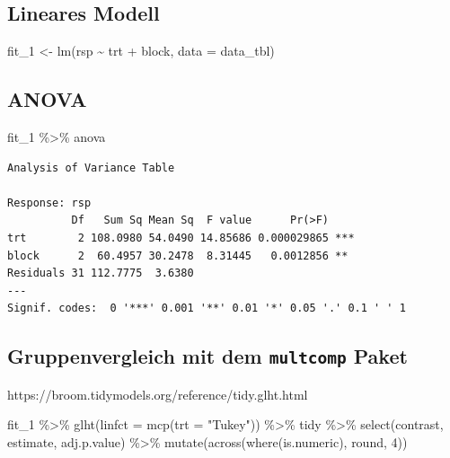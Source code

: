 \documentclass[
  letterpaper,
  DIV=11,
  oneside]{scrreport}
\newenvironment{Shaded}{\begin{snugshade}}{\end{snugshade}}
\newcommand{\AttributeTok}[1]{\textcolor[rgb]{0.40,0.45,0.13}{#1}}
\newcommand{\DecValTok}[1]{\textcolor[rgb]{0.68,0.00,0.00}{#1}}
\newcommand{\FunctionTok}[1]{\textcolor[rgb]{0.28,0.35,0.67}{#1}}
\newcommand{\NormalTok}[1]{\textcolor[rgb]{0.00,0.23,0.31}{#1}}
\newcommand{\OtherTok}[1]{\textcolor[rgb]{0.00,0.23,0.31}{#1}}
\newcommand{\SpecialCharTok}[1]{\textcolor[rgb]{0.37,0.37,0.37}{#1}}
\newcommand{\StringTok}[1]{\textcolor[rgb]{0.13,0.47,0.30}{#1}}
\begin{document}
\hypertarget{lineares-modell}{%
\subsection{Lineares Modell}\label{lineares-modell}}

\begin{Shaded}
\begin{Highlighting}[]
\NormalTok{fit\_1 }\OtherTok{\textless{}{-}} \FunctionTok{lm}\NormalTok{(rsp }\SpecialCharTok{\textasciitilde{}}\NormalTok{ trt }\SpecialCharTok{+}\NormalTok{ block, }\AttributeTok{data =}\NormalTok{ data\_tbl)}
\end{Highlighting}
\end{Shaded}

\hypertarget{anova}{%
\subsection{ANOVA}\label{anova}}

\begin{Shaded}
\begin{Highlighting}[]
\NormalTok{fit\_1 }\SpecialCharTok{\%\textgreater{}\%}\NormalTok{ anova}
\end{Highlighting}
\end{Shaded}

\begin{verbatim}
Analysis of Variance Table

Response: rsp
          Df   Sum Sq Mean Sq  F value      Pr(>F)    
trt        2 108.0980 54.0490 14.85686 0.000029865 ***
block      2  60.4957 30.2478  8.31445   0.0012856 ** 
Residuals 31 112.7775  3.6380                         
---
Signif. codes:  0 '***' 0.001 '**' 0.01 '*' 0.05 '.' 0.1 ' ' 1
\end{verbatim}

\hypertarget{gruppenvergleich-mit-dem-multcomp-paket}{%
\subsection{\texorpdfstring{Gruppenvergleich mit dem \texttt{multcomp}
Paket}{Gruppenvergleich mit dem multcomp Paket}}\label{gruppenvergleich-mit-dem-multcomp-paket}}

https://broom.tidymodels.org/reference/tidy.glht.html

\begin{Shaded}
\begin{Highlighting}[]
\NormalTok{fit\_1 }\SpecialCharTok{\%\textgreater{}\%} 
  \FunctionTok{glht}\NormalTok{(}\AttributeTok{linfct =} \FunctionTok{mcp}\NormalTok{(}\AttributeTok{trt =} \StringTok{"Tukey"}\NormalTok{)) }\SpecialCharTok{\%\textgreater{}\%} 
\NormalTok{  tidy }\SpecialCharTok{\%\textgreater{}\%} 
  \FunctionTok{select}\NormalTok{(contrast, estimate, adj.p.value) }\SpecialCharTok{\%\textgreater{}\%} 
  \FunctionTok{mutate}\NormalTok{(}\FunctionTok{across}\NormalTok{(}\FunctionTok{where}\NormalTok{(is.numeric), round, }\DecValTok{4}\NormalTok{))}
\end{Highlighting}
\end{Shaded}
\end{document}
